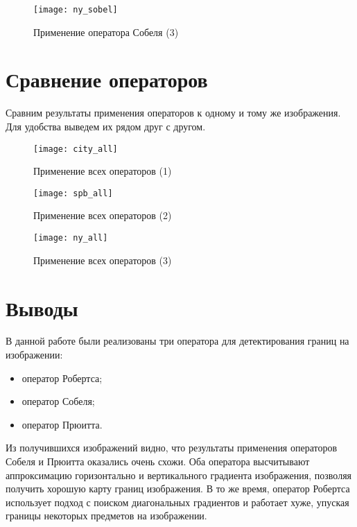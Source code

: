 \begin{figure}[H]
	\centering
	\texttt{[image: ny\_sobel]}
	\caption{Применение оператора Собеля (3)}
\end{figure}

\newpage

\section{Сравнение операторов}

Сравним результаты применения операторов к одному и тому же изображения. Для удобства выведем их рядом друг с другом.

\begin{figure}[H]
	\centering
	\texttt{[image: city\_all]}
	\caption{Применение всех операторов (1)}
\end{figure}

\begin{figure}[H]
	\centering
	\texttt{[image: spb\_all]}
	\caption{Применение всех операторов (2)}
\end{figure}

\begin{figure}[H]
	\centering
	\texttt{[image: ny\_all]}
	\caption{Применение всех операторов (3)}
\end{figure}

\section{Выводы}

В данной работе были реализованы три оператора для детектирования границ на изображении:

\begin{itemize}
	\item оператор Робертса;
	\item оператор Собеля;
	\item оператор Прюитта.
\end{itemize}

Из получившихся изображений видно, что результаты применения операторов Собеля и Прюитта оказались очень схожи. Оба оператора высчитывают аппроксимацию горизонтально и вертикального градиента изображения, позволяя получить хорошую карту границ изображения. В то же время, оператор Робертса использует подход с поиском диагональных градиентов и работает хуже, упуская границы некоторых предметов на изображении.



